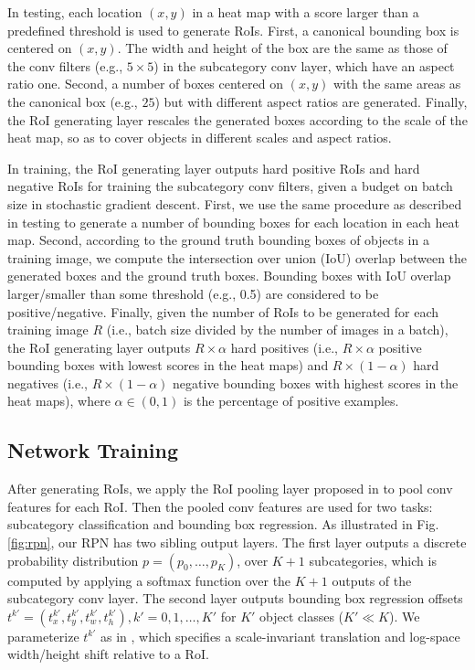 \documentclass[10pt,twocolumn,letterpaper]{article}
\begin{document}
In testing, each location $(x,y)$ in a heat map with a score larger than a predefined threshold is used to generate RoIs. First, a canonical bounding box is centered on $(x,y)$. The width and height of the box are the same as those of the conv filters (e.g., $5 \times 5 $) in the subcategory conv layer, which have an aspect ratio one. Second, a number of boxes centered on $(x,y)$ with the same areas as the canonical box (e.g., $25$) but with different aspect ratios are generated. Finally, the RoI generating layer rescales the generated boxes according to the scale of the heat map, so as to cover objects in different scales and aspect ratios.

In training, the RoI generating layer outputs hard positive RoIs and hard negative RoIs for training the subcategory conv filters, given a budget on batch size in stochastic gradient descent. First, we use the same procedure as described in testing to generate a number of bounding boxes for each location in each heat map. Second, according to the ground truth bounding boxes of objects in a training image, we compute the intersection over union (IoU) overlap between the generated boxes and the ground truth boxes. Bounding boxes with IoU overlap larger/smaller than some threshold (e.g., 0.5) are considered to be positive/negative. Finally, given the number of RoIs to be generated for each training image $R$ (i.e., batch size divided by the number of images in a batch), the RoI generating layer outputs $R \times \alpha$ hard positives (i.e., $R \times \alpha$ positive bounding boxes with lowest scores in the heat maps) and $R \times (1-\alpha)$ hard negatives (i.e., $R \times (1-\alpha)$ negative bounding boxes with highest scores in the heat maps), where $\alpha \in (0,1)$ is the percentage of positive examples. 



\subsection{Network Training} \label{sec:rpn_loss}

After generating RoIs, we apply the RoI pooling layer proposed in \cite{girshick2015fast} to pool conv features for each RoI. Then the pooled conv features are used for two tasks: subcategory classification and bounding box regression. As illustrated in Fig. \ref{fig:rpn}, our RPN has two sibling output layers. The first layer outputs a discrete probability distribution $p = (p_0, \ldots, p_K)$, over $K+1$ subcategories, which is computed by applying a softmax function over the $K+1$ outputs of the subcategory conv layer. The second layer outputs bounding box regression offsets $t^{k'} = (t_x^{k'}, t_y^{k'}, t_w^{k'}, t_h^{k'}), {k'} = 0, 1, \ldots, K'$ for $K'$ object classes ($K' \ll K$). We parameterize $t^{k'}$ as in \cite{girshick2013rich}, which specifies a scale-invariant translation and log-space width/height shift relative to a RoI.
\end{document}
